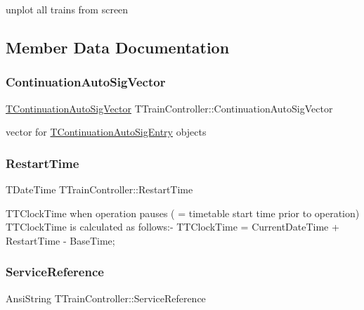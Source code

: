 unplot all trains from screen 

\subsection{Member Data Documentation}
\mbox{\label{class_t_train_controller_a0b412f7b88f829632e54bffc0659ac3b}} 
\subsubsection{\texorpdfstring{Continuation\+Auto\+Sig\+Vector}{ContinuationAutoSigVector}}
{\footnotesize\ttfamily \mbox{\hyperlink{class_t_train_controller_a1908f7d1a5dcfebf2f747efbdd6f4681}{T\+Continuation\+Auto\+Sig\+Vector}} T\+Train\+Controller\+::\+Continuation\+Auto\+Sig\+Vector}

vector for \mbox{\hyperlink{class_t_train_controller_1_1_t_continuation_auto_sig_entry}{T\+Continuation\+Auto\+Sig\+Entry}} objects \mbox{\label{class_t_train_controller_a7d7dc55374ee043f1045b1d4ff91853f}} 
\subsubsection{\texorpdfstring{Restart\+Time}{RestartTime}}
{\footnotesize\ttfamily T\+Date\+Time T\+Train\+Controller\+::\+Restart\+Time}

T\+T\+Clock\+Time when operation pauses ( = timetable start time prior to operation) T\+T\+Clock\+Time is calculated as follows\+:-\/ T\+T\+Clock\+Time = Current\+Date\+Time + Restart\+Time -\/ Base\+Time; \mbox{\label{class_t_train_controller_a1b103ff111456f178286d97002b63afb}} 
\subsubsection{\texorpdfstring{Service\+Reference}{ServiceReference}}
{\footnotesize\ttfamily Ansi\+String T\+Train\+Controller\+::\+Service\+Reference}

